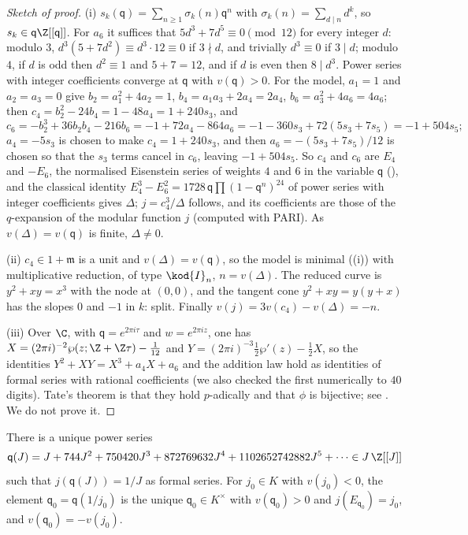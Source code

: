 \begin{proof}[Sketch of proof]
(i) $s_k(\mathsf q)=\sum_{n\ge1}\sigma_k(n)\mathsf q^n$ with $\sigma_k(n)=\sum_{d\mid n}d^k$, so $s_k\in\mathsf q\Z[[\mathsf q]]$. For $a_6$ it suffices that
$5d^3+7d^5\equiv0\pmod{12}$ for every integer $d$: modulo $3$, $d^3(5+7d^2)\equiv d^3\cdot12\equiv0$ if $3\nmid d$, and trivially $d^3\equiv0$ if $3\mid d$; modulo $4$, if $d$ is
odd then $d^2\equiv1$ and $5+7=12$, and if $d$ is even then $8\mid d^3$. Power series with integer coefficients converge
at $\mathsf q$ with $v(\mathsf q)>0$. For the model, $a_1=1$ and $a_2=a_3=0$ give $b_2=a_1^2+4a_2=1$,
$b_4=a_1a_3+2a_4=2a_4$, $b_6=a_3^2+4a_6=4a_6$; then $c_4=b_2^2-24b_4=1-48a_4=1+240s_3$, and
\[
c_6=-b_2^3+36b_2b_4-216b_6=-1+72a_4-864a_6=-1-360s_3+72(5s_3+7s_5)=-1+504s_5 ;
\]
$a_4=-5s_3$ is chosen to make $c_4=1+240s_3$, and then $a_6=-(5s_3+7s_5)/12$ is chosen so that the $s_3$ terms cancel in
$c_6$, leaving $-1+504s_5$. So $c_4$ and $c_6$
are $E_4$ and $-E_6$, the normalised Eisenstein series of weights $4$ and $6$ in the variable $\mathsf q$ (),
and the classical identity $E_4^3-E_6^2=1728\,\mathsf q\prod(1-\mathsf q^n)^{24}$ of power series with
integer coefficients gives $\Delta$; $j=c_4^3/\Delta$ follows, and its coefficients are those of the $q$-expansion of the
modular function $j$ (computed with PARI). As $v(\Delta)=v(\mathsf q)$ is finite, $\Delta\ne0$.

(ii) $c_4\in1+\mathfrak m$ is a unit and $v(\Delta)=v(\mathsf q)$, so the model is minimal ((i)) with
multiplicative reduction, of type $\kod{I}_n$, $n=v(\Delta)$. The reduced curve is $y^2+xy=x^3$ with the node at $(0,0)$, and the
tangent cone $y^2+xy=y(y+x)$ has the slopes $0$ and $-1$ in $k$: split. Finally $v(j)=3v(c_4)-v(\Delta)=-n$.

(iii) Over $\C$, with $\mathsf q=e^{2\pi i\tau}$ and $w=e^{2\pi iz}$, one has $X=(2\pi i)^{-2}\wp(z;\Z+\Z\tau)-\frac1{12}$ and
$Y=(2\pi i)^{-3}\tfrac12\wp'(z)-\tfrac12X$, so the identities $Y^2+XY=X^3+a_4X+a_6$ and the addition law hold as identities of
formal series with rational coefficients (we also checked the first numerically to $40$ digits). Tate's theorem is that
they hold $p$-adically and that $\phi$ is bijective; see \cite[V.3]{SilvermanATAEC}. We do not prove it.
\end{proof}

\begin{proposition}[inverting $j$]\label{prop:reduction:j-inverse}
There is a unique power series
\[
\mathsf q(J)=J+744J^2+750420J^3+872769632J^4+1102652742882J^5+\cdots\in J\,\Z[[J]]
\]
such that $j(\mathsf q(J))=1/J$ as formal series. For $j_0\in K$ with $v(j_0)<0$, the element $\mathsf q_0=\mathsf q(1/j_0)$ is the unique
$\mathsf q_0\in K^\times$ with $v(\mathsf q_0)>0$ and $j(E_{\mathsf q_0})=j_0$, and $v(\mathsf q_0)=-v(j_0)$.
\end{proposition}

